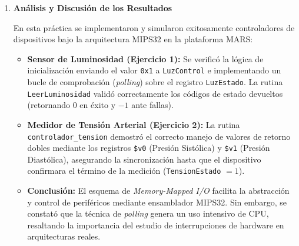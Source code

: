 \documentclass[12pt,letterpaper]{article}
\begin{document}
\begin{enumerate}
    \item \textbf{\large\color{UCBlue}Análisis y Discusión de los Resultados}
    
    \vspace{0.2cm}
    En esta práctica se implementaron y simularon exitosamente controladores de dispositivos bajo la arquitectura MIPS32 en la plataforma MARS:
    \begin{itemize}
        \item \textbf{Sensor de Luminosidad (Ejercicio 1):} Se verificó la lógica de inicialización enviando el valor \texttt{0x1} a \texttt{LuzControl} e implementando un bucle de comprobación (\textit{polling}) sobre el registro \texttt{LuzEstado}. La rutina \texttt{LeerLuminosidad} validó correctamente los códigos de estado devueltos (retornando $0$ en éxito y $-1$ ante fallas).
        \item \textbf{Medidor de Tensión Arterial (Ejercicio 2):} La rutina \texttt{controlador\_tension} demostró el correcto manejo de valores de retorno dobles mediante los registros \texttt{\$v0} (Presión Sistólica) y \texttt{\$v1} (Presión Diastólica), asegurando la sincronización hasta que el dispositivo confirmara el término de la medición (\texttt{TensionEstado} $= 1$).
        \item \textbf{Conclusión:} El esquema de \textit{Memory-Mapped I/O} facilita la abstracción y control de periféricos mediante ensamblador MIPS32. Sin embargo, se constató que la técnica de \textit{polling} genera un uso intensivo de CPU, resaltando la importancia del estudio de interrupciones de hardware en arquitecturas reales.
    \end{itemize}

\end{enumerate}
\end{document}
